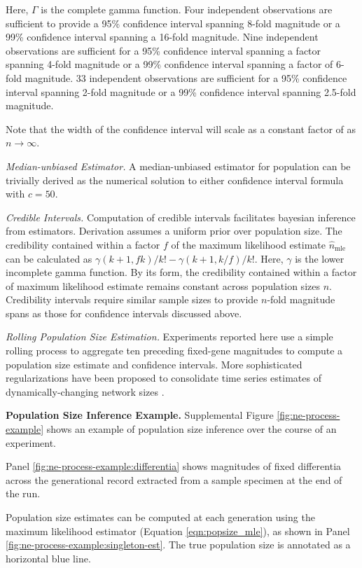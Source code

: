 Here, $\Gamma$ is the complete gamma function.
Four independent observations are sufficient to provide a 95\% confidence interval spanning 8-fold magnitude or a 99\% confidence interval spanning a 16-fold magnitude.
Nine independent observations are sufficient for a 95\% confidence interval spanning a factor spanning 4-fold magnitude or a 99\% confidence interval spanning a factor of 6-fold magnitude.
33 independent observations are sufficient for a 95\% confidence interval spanning 2-fold magnitude or a 99\% confidence interval spanning 2.5-fold magnitude.

Note that the width of the confidence interval will scale as a constant factor of as $n \to \infty$.

\textit{Median-unbiased Estimator.}
A median-unbiased estimator for population can be trivially derived as the numerical solution to either confidence interval formula with $c = 50$.

\textit{Credible Intervals.}
Computation of credible intervals facilitates bayesian inference from estimators.
Derivation assumes a uniform prior over population size.
The credibility contained within a factor $f$ of the maximum likelihood estimate $\hat{n}_\mathrm{mle}$ can be calculated as $\gamma(k + 1, f k)/k! - \gamma(k + 1, k/f)/k!$.
Here, $\gamma$ is the lower incomplete gamma function.
By its form, the credibility contained within a factor of maximum likelihood estimate remains constant across population sizes $n$.
Credibility intervals require similar sample sizes to provide $n$-fold magnitude spans as those for confidence intervals discussed above.

\textit{Rolling Population Size Estimation.}
Experiments reported here use a simple rolling process to aggregate ten preceding fixed-gene magnitudes to compute a population size estimate and confidence intervals.
More sophisticated regularizations have been proposed to consolidate time series estimates of dynamically-changing network sizes \citep{hakan2012distributed}.

\textbf{Population Size Inference Example.}
Supplemental Figure \ref{fig:ne-process-example} shows an example of population size inference over the course of an experiment.

Panel \ref{fig:ne-process-example:differentia} shows magnitudes of fixed differentia across the generational record extracted from a sample specimen at the end of the run.

Population size estimates can be computed at each generation using the maximum likelihood estimator (Equation \ref{eqn:popsize_mle}), as shown in Panel \ref{fig:ne-process-example:singleton-est}.
The true population size is annotated as a horizontal blue line.

